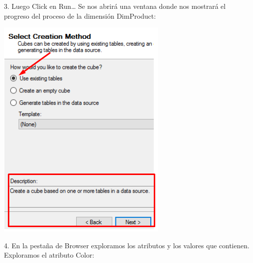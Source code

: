 3. Luego Click en Run…
Se nos abrirá una ventana donde nos mostrará el progreso del proceso de la dimensión DimProduct:
	\begin{center}
	\includegraphics[width=\columnwidth]{images/task3/img17}
    \end{center}	
    

4. En la pestaña de Browser exploramos los atributos y los valores que contienen.
Exploramos el atributo Color:

